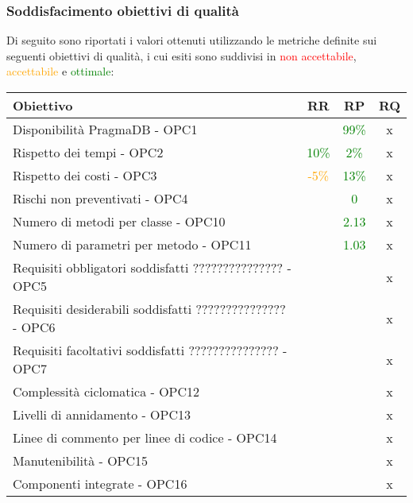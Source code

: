 \documentclass[PdQ.tex]{subfiles}
\begin{document}
\subsubsection{Soddisfacimento obiettivi di qualità}
			Di seguito sono riportati i valori ottenuti utilizzando le metriche definite sui seguenti obiettivi di qualità, i cui esiti sono suddivisi in \textcolor{red}{non accettabile}, \textcolor{orange}{accettabile} e \textcolor{green}{ottimale}:
			\begin{table}[h]
				\centering
				\begin{tabular}{l c c c}
					\hline
					\rule[-0.3cm]{0cm}{0.8cm}
					\textbf{Obiettivo} & \textbf{RR} & \textbf{RP} & \textbf{RQ}\\
					\hline
					\rule[0cm]{0cm}{0.4cm}
					Disponibilità PragmaDB - OPC1 & & \textcolor{green}{99\%} & x \\
					\rule[0cm]{0cm}{0.4cm}
					Rispetto dei tempi - OPC2 & \textcolor{green}{10\%} & \textcolor{green}{2\%} & x \\
					\rule[0cm]{0cm}{0.4cm}
					Rispetto dei costi - OPC3 & \textcolor{orange}{-5\%} & \textcolor{green}{13\%} & x\\ 
					\rule[0cm]{0cm}{0.4cm}
					Rischi non preventivati - OPC4 & & \textcolor{green}{0} & x\\ 
					\rule[0cm]{0cm}{0.4cm}
					Numero di metodi per classe - OPC10 & & \textcolor{green}{2.13} & x\\ 
					\rule[0cm]{0cm}{0.4cm}
					Numero di parametri per metodo - OPC11 & & \textcolor{green}{1.03} & x\\
					\rule[0cm]{0cm}{0.4cm} 
					Requisiti obbligatori soddisfatti ??????????????? - OPC5 & & & x \\
					\rule[0cm]{0cm}{0.4cm} 
					Requisiti desiderabili soddisfatti ??????????????? - OPC6 & & & x \\
					\rule[0cm]{0cm}{0.4cm} 
					Requisiti facoltativi soddisfatti ??????????????? - OPC7 & & & x \\
					\rule[0cm]{0cm}{0.4cm} 
					Complessità ciclomatica - OPC12 & & & x \\
					\rule[0cm]{0cm}{0.4cm} 
					Livelli di annidamento - OPC13 & & & x \\
					\rule[0cm]{0cm}{0.4cm} 
					Linee di commento per linee di codice - OPC14 & & & x \\
					\rule[0cm]{0cm}{0.4cm} 
					Manutenibilità - OPC15 & & & x \\
					\rule[0cm]{0cm}{0.4cm} 
					Componenti integrate - OPC16 & & & x \\

\end{tabular}
\end{table}
\end{document}
